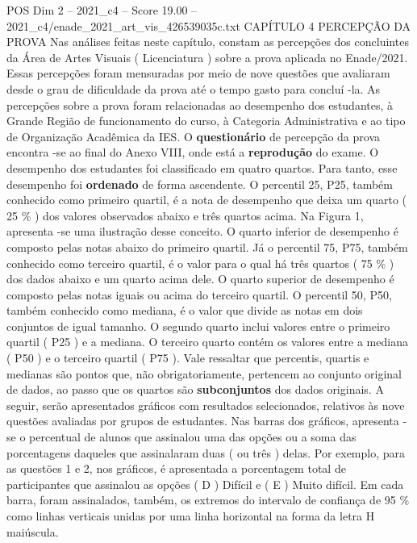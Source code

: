 \begin{textsample}{POS Dim 2 – 2021\_c4 – Score 19.00 – 2021\_c4/enade\_2021\_art\_vis\_426539035c.txt}  \label{ex:f2_pos_040}
CAPÍTULO 4 PERCEPÇÃO DA PROVA Nas análises feitas neste capítulo, constam as percepções dos concluintes da Área de Artes Visuais ( Licenciatura ) sobre a prova aplicada no Enade/2021.
Essas percepções foram mensuradas por meio de nove questões que avaliaram desde o grau de dificuldade da prova até o tempo gasto para concluí -la.
As percepções sobre a prova foram relacionadas ao desempenho dos estudantes, à Grande Região de funcionamento do curso, à Categoria Administrativa e ao tipo de Organização Acadêmica da IES.
O \textbf{questionário} de percepção da prova encontra -se ao final do Anexo VIII, onde está a \textbf{reprodução} do exame.
O desempenho dos estudantes foi classificado em quatro quartos.
Para tanto, esse desempenho foi \textbf{ordenado} de forma ascendente.
O percentil 25, P25, também conhecido como primeiro quartil, é a nota de desempenho que deixa um quarto ( 25 \% ) dos valores observados abaixo e três quartos acima.
Na Figura 1, apresenta -se uma ilustração desse conceito.
O quarto inferior de desempenho é composto pelas notas abaixo do primeiro quartil.
Já o percentil 75, P75, também conhecido como terceiro quartil, é o valor para o qual há três quartos ( 75 \% ) dos dados abaixo e um quarto acima dele.
O quarto superior de desempenho é composto pelas notas iguais ou acima do terceiro quartil.
O percentil 50, P50, também conhecido como mediana, é o valor que divide as notas em dois conjuntos de igual tamanho.
O segundo quarto inclui valores entre o primeiro quartil ( P25 ) e a mediana.
O terceiro quarto contém os valores entre a mediana ( P50 ) e o terceiro quartil ( P75 ).
Vale ressaltar que percentis, quartis e medianas são pontos que, não obrigatoriamente, pertencem ao conjunto original de dados, ao passo que os quartos são \textbf{subconjuntos} dos dados originais.
A seguir, serão apresentados gráficos com resultados selecionados, relativos às nove questões avaliadas por grupos de estudantes.
Nas barras dos gráficos, apresenta -se o percentual de alunos que assinalou uma das opções ou a soma das porcentagens daqueles que assinalaram duas ( ou três ) delas.
Por exemplo, para as questões 1 e 2, nos gráficos, é apresentada a porcentagem total de participantes que assinalou as opções ( D ) Difícil e ( E ) Muito difícil.
Em cada barra, foram assinalados, também, os extremos do intervalo de confiança de 95 \% como linhas verticais unidas por uma linha horizontal na forma da letra H maiúscula.

\end{textsample}

